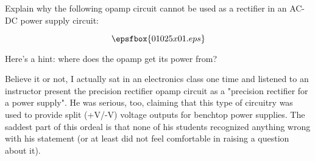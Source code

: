 

Explain why the following opamp circuit cannot be used as a rectifier in an AC-DC power supply circuit:

$$\epsfbox{01025x01.eps}$$







Here's a hint: where does the opamp get its power from?







Believe it or not, I actually sat in an electronics class one time and listened to an instructor present the precision rectifier opamp circuit as a "precision rectifier for a power supply".  He was serious, too, claiming that this type of circuitry was used to provide split (+V/-V) voltage outputs for benchtop power supplies.  The saddest part of this ordeal is that none of his students recognized anything wrong with his statement (or at least did not feel comfortable in raising a question about it).




